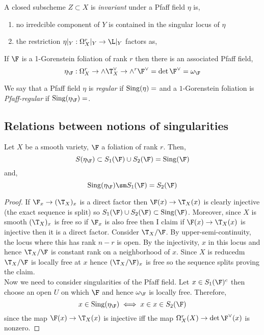 \documentclass[12pt]{article}
\begin{document}
\begin{defn}
A closed subscheme $Z \subset X$ is \textit{invariant} under a Pfaff field $\eta$ is,
\begin{enumerate}
\item no irredcible component of $Y$ is contained in the singular locus of $\eta$

\item the restriction $\eta|_Y : \Omega_X^r|_Y \to \L|_Y$ factors as,
\begin{center}
\end{center}
\end{enumerate}
\end{defn}

\begin{defn}
If $\F$ is a 1-Gorenstein foliation of rank $r$ then there is an associated Pfaff field,
\[ \eta_\F : \Omega^r_X \to \wedge \T_X^\vee \to \wedge^r \F^\vee = \det{\F}^\vee = \omega_\F \]
\end{defn}

\begin{defn}
We say that a Pfaff field $\eta$ is \textit{regular} if $\Sing(\eta) = \empty$ and a $1$-Gorenstein foliation is \textit{Pfaff-regular} if $\Sing(\eta_\F) = \empty$.
\end{defn}

\subsection{Relations between notions of singularities}

\begin{lemma}
Let $X$ be a smooth variety, $\F$ a foliation of rank $r$. Then,
\[ S(\eta_{\F}) \subset S_1(\F) \cup S_2(\F) = \Sing(\F) \]
and,
\[ \Sing(\eta_\F) \sm S_1(\F) = S_2(\F) \]
\end{lemma}

\begin{proof}
If $\F_x \to (\T_X)_x$ is a direct factor then $\F(x) \to \T_X(x)$ is clearly injective (the exact sequence is split) so $S_1(\F) \cup S_2(\F) \subset \Sing(\F)$. Moreover, since $X$ is smooth $(\T_X)_x$ is free so if $\F_x$ is also free then I claim if $\F(x) \to \T_X(x)$ is injective then it is a direct factor. Consider $\T_X / \F$. By upper-semi-continuity, the locus where this has rank $n - r$ is open. By the injectivity, $x$ in this locus and hence $\T_X / \F$ is constant rank on a neighborhood of $x$. Since $X$ is reducedm $\T_X / \F$ is locally free at $x$ hence $(\T_X / \F)_x$ is free so the sequence splits proving the claim. 
\bigskip\\
Now we need to consider singularities of the Pfaff field. Let $x \in S_1(\F)^c$ then choose an open $U$ on which $\F$ and hence $\omega_\F$ is locally free. Therefore,
\[ x \in \Sing(\eta_\F) \iff x \in x \in S_2(\F) \]
since the map $\F(x) \to \T_X(x)$ is injective iff the map $\Omega_X^r(X) \to \det{\F^\vee(x)}$ is nonzero. 
\end{proof}
\end{document}
